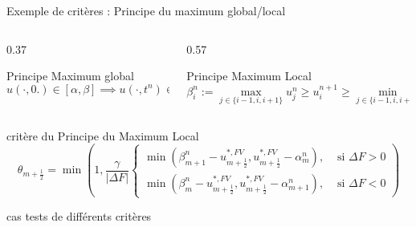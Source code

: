 \begin{frame}{Exemple de critères : Principe du maximum global/local}
\begin{columns}
\begin{column}{0.37\textwidth}
\begin{block}{Principe Maximum global}
\begin{equation}
    u(\cdot,0.)\in [\alpha,\beta] \implies u(\cdot,t^n)\in [\alpha,\beta]
\end{equation}
\end{block}
\end{column}

\begin{column}{0.57\textwidth}
\begin{block}{Principe Maximum Local}
\begin{equation}
    \beta_i^n := \max_{j\in\{i-1,i,i+1\}} u_j^n \geq u_i^{n+1} \geq \min_{j\in\{i-1,i,i+1\}} u_j^n =: \alpha_i^n
\end{equation}
\end{block}
\end{column}

\end{columns}


\begin{block}{critère du Principe du Maximum Local}
    \begin{equation}
\theta_{m+\frac{1}{2}} = \min \left(1, \frac{\gamma}{|\Delta F|}  \left\{
    \begin{aligned}
    \min\left( \beta_{m+1}^n-{u}_{m+\frac{1}{2}}^{*,FV},{u}_{m+\frac{1}{2}}^{*,FV} - \alpha_{m}^n \right), &\text{ si }\Delta F >0  \\
    \min\left( \beta_{m}^n-{u}_{m+\frac{1}{2}}^{*,FV},{u}_{m+\frac{1}{2}}^{*,FV} - \alpha_{m+1}^n \right), &\text{ si }\Delta F <0  
    \end{aligned}\right.
    \right)
\end{equation}  
\end{block}

\begin{block}{cas tests de différents critères}
\hspace{2cm}
\hspace{2cm}

\end{block}

\end{frame}



